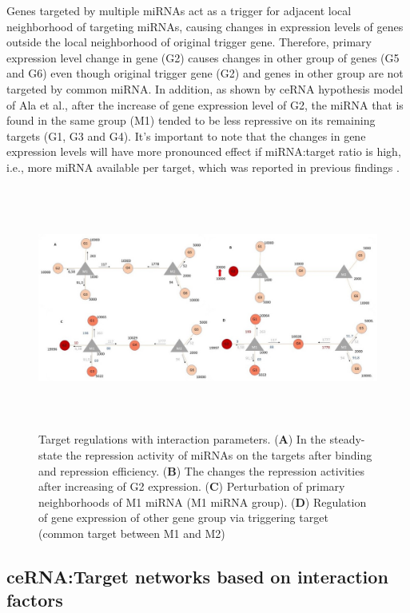 \documentclass[a4,center,fleqn]{NAR}
\begin{document}
Genes targeted by multiple miRNAs act as a trigger for adjacent local
neighborhood of targeting miRNAs, causing changes in expression levels
of genes outside the local neighborhood of original trigger gene.
Therefore, primary expression level change in gene (G2) causes changes
in other group of genes (G5 and G6) even though original trigger gene
(G2) and genes in other group are not targeted by common miRNA. In
addition, as shown by ceRNA hypothesis model of Ala et al., after the
increase of gene expression level of G2, the miRNA that is found in the
same group (M1) tended to be less repressive on its remaining targets
(G1, G3 and G4). It's important to note that the changes in gene
expression levels will have more pronounced effect if miRNA:target ratio
is high, i.e., more miRNA available per target, which was reported in
previous findings
\citep{arvey_target_2010, bosson_endogenous_2014, denzler_assessing_2014}.

\begin{figure}[ht]
\begin{center}
\includegraphics[width=15cm,height=8cm]{Fig3.jpg}
\end{center}
\caption{Target regulations with interaction parameters. 
     (\textbf{A}) In the steady-state the repression activity of miRNAs on the targets after binding and repression efficiency. 
     (\textbf{B}) The changes the repression activities after increasing of G2 expression. 
     (\textbf{C}) Perturbation of primary neighborhoods of M1 miRNA (M1 miRNA group). 
     (\textbf{D}) Regulation of gene expression of other gene group via triggering target (common target between M1 and M2)}
\label{fig:fig3}
\end{figure}

\subsection{ceRNA:Target networks based on interaction factors}
\end{document}
